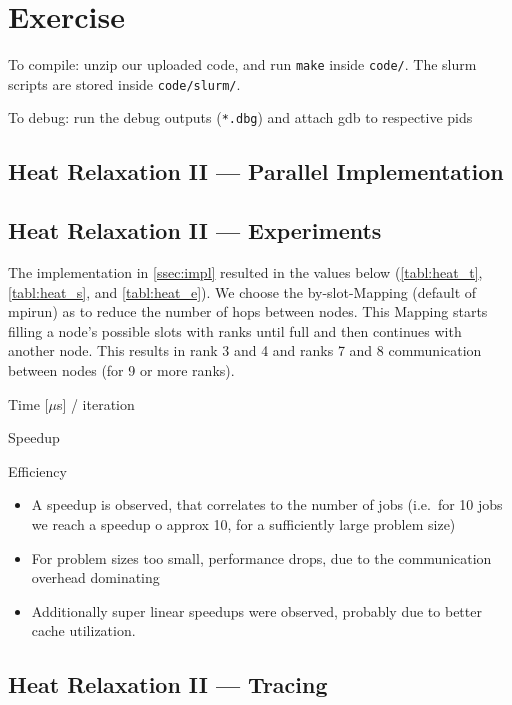 \documentclass[]{scrartcl}
\newcommand{\exercise}{Exercise \thesection}
\begin{document}
\section*{\exercise}

To compile: unzip our uploaded code, and run \verb|make| inside \verb|code/|.
The slurm scripts are stored inside \verb|code/slurm/|.

To debug: run the debug outputs (\verb|*.dbg|) and attach gdb to respective pids

\subsection{Heat Relaxation II --- Parallel Implementation}\label{ssec:impl}
\subsection{Heat Relaxation II --- Experiments}

The implementation in \autoref{ssec:impl} resulted in the values below (\autoref{tabl:heat_t}, \autoref{tabl:heat_s}, and \autoref{tabl:heat_e}).
We choose the by-slot-Mapping (default of mpirun) as to reduce the number of hops between nodes.
This Mapping starts filling a node's possible slots with ranks until full and then continues with another node.
This results in rank 3 and 4 and ranks 7 and 8 communication between nodes (for 9 or more ranks).

\begin{table}[ht]
  \caption{Time [$\mu$s] / iteration}\label{tabl:heat_t}
  
\end{table}

\begin{table}[ht]
  \caption{Speedup}\label{tabl:heat_s}
  
\end{table}

\begin{table}[ht]
  \caption{Efficiency}\label{tabl:heat_e}
  
\end{table}

\begin{itemize}
  \item A speedup is observed, that correlates to the number of jobs (i.e.\ for 10 jobs we reach a speedup o approx 10, for a sufficiently large problem size)
  \item For problem sizes too small, performance drops, due to the communication overhead dominating
  \item Additionally super linear speedups were observed, probably due to better cache utilization.
\end{itemize}

\subsection{Heat Relaxation II --- Tracing}
\end{document}
